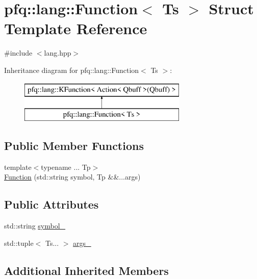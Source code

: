 \hypertarget{structpfq_1_1lang_1_1Function}{}\section{pfq\+:\+:lang\+:\+:Function$<$ Ts $>$ Struct Template Reference}
\label{structpfq_1_1lang_1_1Function}


{\ttfamily \#include $<$lang.\+hpp$>$}

Inheritance diagram for pfq\+:\+:lang\+:\+:Function$<$ Ts $>$\+:\begin{figure}[H]
\begin{center}
\leavevmode
\includegraphics[height=2.000000cm]{structpfq_1_1lang_1_1Function}
\end{center}
\end{figure}
\subsection*{Public Member Functions}
\begin{DoxyCompactItemize}
\item 
{\footnotesize template$<$typename ... Tp$>$ }\\\hyperlink{structpfq_1_1lang_1_1Function_a262782ac0fc302fb2c1ce704e272a7a1}{Function} (std\+::string symbol, Tp \&\&...args)
\end{DoxyCompactItemize}
\subsection*{Public Attributes}
\begin{DoxyCompactItemize}
\item 
std\+::string \hyperlink{structpfq_1_1lang_1_1Function_a603c829dffbee5b0cd1900672cf68492}{symbol\+\_\+}
\item 
std\+::tuple$<$ Ts... $>$ \hyperlink{structpfq_1_1lang_1_1Function_a1451f8a19d96e0d3e2885f3b7278c8d3}{args\+\_\+}
\end{DoxyCompactItemize}
\subsection*{Additional Inherited Members}


